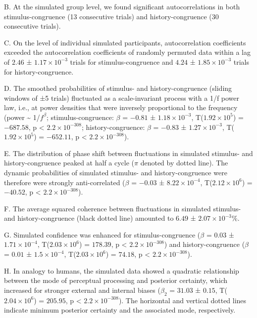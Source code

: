 \documentclass[
]{article}
\begin{document}
B. At the simulated group level, we found significant autocorrelations
in both stimulus-congruence (13 consecutive trials) and
history-congruence (30 consecutive trials).

C. On the level of individual simulated participants, autocorrelation
coefficients exceeded the autocorrelation coefficients of randomly
permuted data within a lag of \(2.46\) ±
\(\ensuremath{1.17\times 10^{-3}}\) trials for stimulus-congruence and
\(4.24\) ± \(\ensuremath{1.85\times 10^{-3}}\) trials for
history-congruence.

D. The smoothed probabilities of stimulus- and history-congruence
(sliding windows of ±5 trials) fluctuated as a scale-invariant process
with a 1/f power law, i.e., at power densities that were inversely
proportional to the frequency (power \textasciitilde{} 1/\(f^\beta\);
stimulus-congruence: \(\beta\) = \(-0.81\) ±
\(\ensuremath{1.18\times 10^{-3}}\),
T(\(\ensuremath{1.92\times 10^{5}}\)) = \(-687.58\), p < \(\ensuremath{2.2\times 10^{-308}}\);
history-congruence: \(\beta\) = \(-0.83\) ±
\(\ensuremath{1.27\times 10^{-3}}\),
T(\(\ensuremath{1.92\times 10^{5}}\)) = \(-652.11\), p < \(\ensuremath{2.2\times 10^{-308}}\)).

E. The distribution of phase shift between fluctuations in simulated
stimulus- and history-congruence peaked at half a cycle (\(\pi\) denoted
by dotted line). The dynamic probabilities of simulated stimulus- and
history-congruence were therefore were strongly anti-correlated
(\(\beta\) = \(-0.03\) ± \(\ensuremath{8.22\times 10^{-4}}\),
T(\(\ensuremath{2.12\times 10^{6}}\)) = \(-40.52\), p < \(\ensuremath{2.2\times 10^{-308}}\)).

F. The average squared coherence between fluctuations in simulated
stimulus- and history-congruence (black dotted line) amounted to
\(6.49\) ± \(\ensuremath{2.07\times 10^{-3}}\)\%.

G. Simulated confidence was enhanced for stimulus-congruence (\(\beta\)
= \(0.03\) ± \(\ensuremath{1.71\times 10^{-4}}\),
T(\(\ensuremath{2.03\times 10^{6}}\)) = \(178.39\), p < \(\ensuremath{2.2\times 10^{-308}}\)) and
history-congruence (\(\beta\) = \(0.01\) ±
\(\ensuremath{1.5\times 10^{-4}}\),
T(\(\ensuremath{2.03\times 10^{6}}\)) = \(74.18\), p < \(\ensuremath{2.2\times 10^{-308}}\)).

H. In analogy to humans, the simulated data showed a quadratic
relationship between the mode of perceptual processing and posterior
certainty, which increased for stronger external and internal biases
(\(\beta_2\) = \(31.03\) ± \(0.15\),
T(\(\ensuremath{2.04\times 10^{6}}\)) = \(205.95\), p < \(\ensuremath{2.2\times 10^{-308}}\)). The
horizontal and vertical dotted lines indicate minimum posterior
certainty and the associated mode, respectively.
\end{document}
